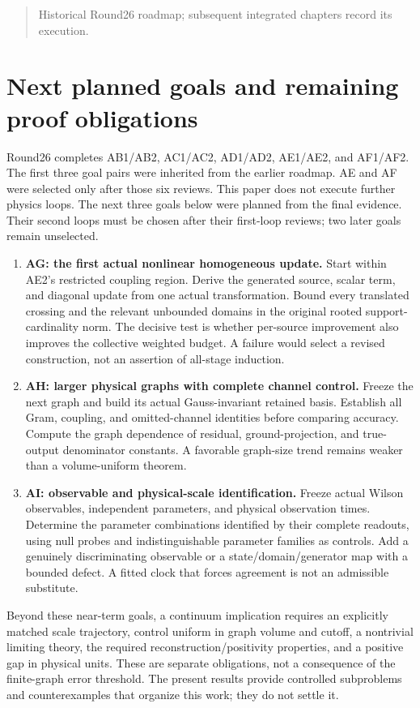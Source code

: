 \begin{quote}\small Historical Round26 roadmap; subsequent integrated chapters record its execution.\end{quote}
\section{Next planned goals and remaining proof obligations}
\label{sec:roadmap}

Round26 completes AB1/AB2, AC1/AC2, AD1/AD2, AE1/AE2, and AF1/AF2. The first three goal pairs were inherited from the earlier roadmap. AE and AF were selected only after those six reviews. This paper does not execute further physics loops. The next three goals below were planned from the final evidence. Their second loops must be chosen after their first-loop reviews; two later goals remain unselected.

\begin{enumerate}
\item \textbf{AG: the first actual nonlinear homogeneous update.}
Start within AE2's restricted coupling region. Derive the generated source, scalar term, and diagonal update from one actual transformation. Bound every translated crossing and the relevant unbounded domains in the original rooted support-cardinality norm. The decisive test is whether per-source improvement also improves the collective weighted budget. A failure would select a revised construction, not an assertion of all-stage induction.
\item \textbf{AH: larger physical graphs with complete channel control.}
Freeze the next graph and build its actual Gauss-invariant retained basis. Establish all Gram, coupling, and omitted-channel identities before comparing accuracy. Compute the graph dependence of residual, ground-projection, and true-output denominator constants. A favorable graph-size trend remains weaker than a volume-uniform theorem.
\item \textbf{AI: observable and physical-scale identification.}
Freeze actual Wilson observables, independent parameters, and physical observation times. Determine the parameter combinations identified by their complete readouts, using null probes and indistinguishable parameter families as controls. Add a genuinely discriminating observable or a state/domain/generator map with a bounded defect. A fitted clock that forces agreement is not an admissible substitute.
\end{enumerate}

Beyond these near-term goals, a continuum implication requires an explicitly matched scale trajectory, control uniform in graph volume and cutoff, a nontrivial limiting theory, the required reconstruction/positivity properties, and a positive gap in physical units. These are separate obligations, not a consequence of the finite-graph error threshold. The present results provide controlled subproblems and counterexamples that organize this work; they do not settle it.

